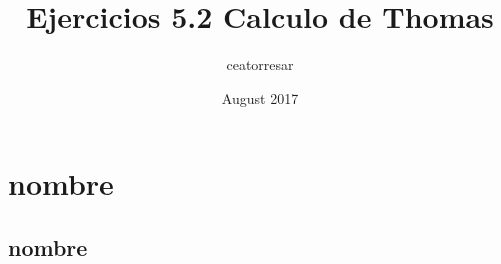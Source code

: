 \documentclass[a4paper]{article}
\title{Ejercicios 5.2 Calculo de Thomas}
\author{ceatorresar }
\date{August 2017}
\begin{document}

	\maketitle %

	\section {nombre} %
	\subsection{nombre} %

\end{document}
